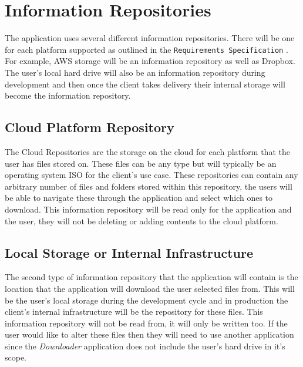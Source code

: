 \section{Information Repositories}
The application uses several different information repositories. There will be one for each platform supported as
outlined in the \texttt{Requirements Specification} \cite{reqs}. For example, AWS storage will be an information
repository as well as Dropbox. The user's local hard drive will also be an information repository during
development and then once the client takes delivery their internal storage will become the information repository.

    \subsection{Cloud Platform Repository}
    The Cloud Repositories are the storage on the cloud for each platform that the user has files stored on.
    These files can be any type but will typically be an operating system ISO for the client's use case. These
    repositories can contain any arbitrary number of files and folders stored within this repository, the users
    will be able to navigate these through the application and select which ones to download. This information repository
    will be read only for the application and the user, they will not be deleting or adding contents to the cloud platform.
    
    \subsection{Local Storage or Internal Infrastructure}
    The second type of information repository that the application will contain is the location that the
    application will download the user selected files from. This will be the user's local storage during the
    development cycle and in production the client's internal infrastructure will be the repository for these
    files. This information repository will not be read from, it will only be written too. If the user would like to alter
    these files then they will need to use another application since the \textit{Downloader} application does not
    include the user's hard drive in it's scope.


